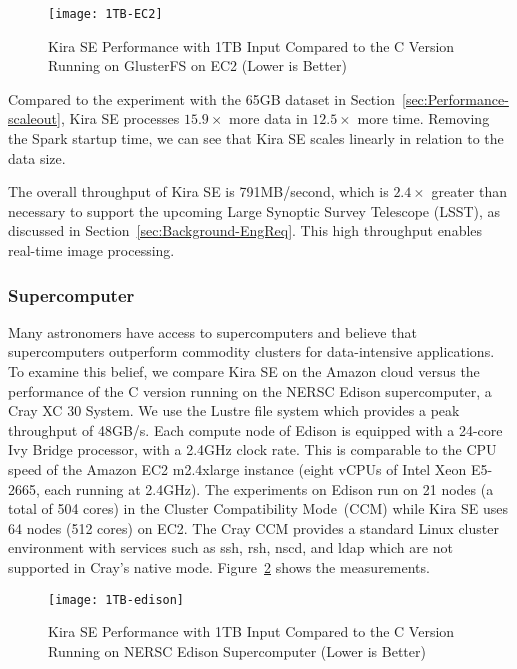 \documentclass[conference]{IEEEtran}
\begin{document}
\begin{figure}[t]
	\begin{center}
		\texttt{[image: 1TB-EC2]}
		\caption{Kira SE Performance with 1TB Input Compared to the C Version Running on GlusterFS on EC2 (Lower is Better)
		\label{fig:1tb-ec2}}
  	\end{center}
\end{figure}

Compared to the experiment with the 65GB dataset in Section~\ref{sec:Performance-scaleout},
Kira SE processes $15.9\times$ more data in $12.5\times$ more time. Removing the Spark
startup time, we can see that Kira SE scales linearly in relation to the data size.

The overall throughput of Kira SE is 791MB/second, which is $2.4\times$ greater than necessary
to support the upcoming Large Synoptic Survey Telescope (LSST), as discussed in
Section~\ref{sec:Background-EngReq}. This high throughput enables real-time image processing.

\subsubsection{Supercomputer}

Many astronomers have access to supercomputers and believe that
supercomputers outperform commodity clusters for data-intensive applications.
To examine this belief, we compare Kira SE on the Amazon cloud versus the performance of
the C version running on the NERSC Edison supercomputer, a Cray XC 30 System. We use
the Lustre file system which provides a peak throughput of 48GB/s. Each compute
node of Edison is equipped with a 24-core Ivy Bridge processor, with a 2.4GHz clock rate.
This is comparable to the CPU speed of the Amazon EC2 m2.4xlarge instance (eight vCPUs of
Intel Xeon E5-2665, each running at 2.4GHz). The experiments on Edison run on 21
nodes (a total of 504 cores) in the Cluster Compatibility Mode~(CCM)
while Kira SE uses 64 nodes (512 cores) on EC2. The Cray CCM provides a 
standard Linux cluster environment with services such as ssh, rsh, nscd, and ldap which 
are not supported in Cray's native mode.
Figure~\ref{fig:1tb-edison} shows the measurements.

\begin{figure}[h]
	\begin{center}
		\texttt{[image: 1TB-edison]}
		\caption{Kira SE Performance with 1TB Input Compared to the C Version Running on NERSC Edison Supercomputer (Lower is Better)
		\label{fig:1tb-edison}}
  	\end{center}
\end{figure}
\end{document}
